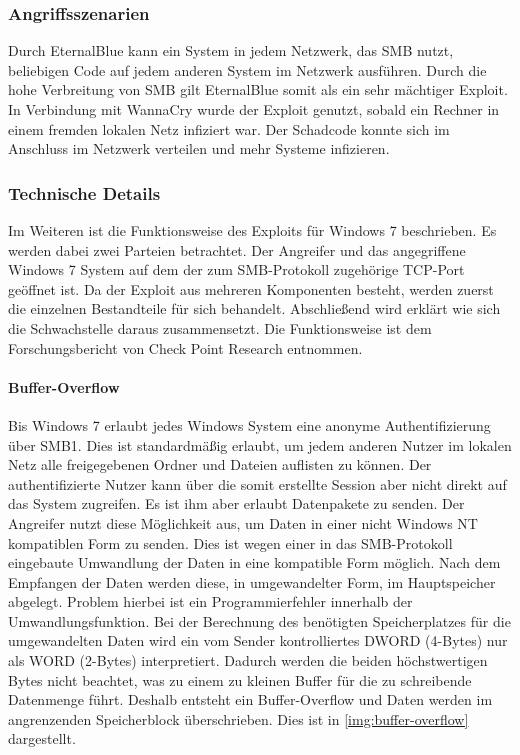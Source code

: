 \documentclass{AIFB_ITI_Crypto_Seminar}
\begin{document}
\subsubsection{Angriffsszenarien}
Durch EternalBlue kann ein System in jedem Netzwerk, das SMB nutzt, beliebigen Code auf jedem anderen System im Netzwerk ausführen. Durch die hohe Verbreitung von SMB gilt EternalBlue somit als ein sehr mächtiger Exploit. In Verbindung mit WannaCry wurde der Exploit genutzt, sobald ein Rechner in einem fremden lokalen Netz infiziert war. Der Schadcode konnte sich im Anschluss im Netzwerk verteilen und mehr Systeme infizieren.

\subsubsection{Technische Details}
Im Weiteren ist die Funktionsweise des Exploits für Windows 7 beschrieben. Es werden dabei zwei Parteien betrachtet. Der Angreifer und das angegriffene Windows 7 System auf dem der zum SMB-Protokoll zugehörige TCP-Port geöffnet ist. Da der Exploit aus mehreren Komponenten besteht, werden zuerst die einzelnen Bestandteile für sich behandelt. Abschließend wird erklärt wie sich die Schwachstelle daraus zusammensetzt. Die Funktionsweise ist dem Forschungsbericht von Check Point Research \cite{checkpoint} entnommen.

\paragraph{Buffer-Overflow}
\label{buffover}
Bis Windows 7 erlaubt jedes Windows System eine anonyme Authentifizierung über SMB1. Dies ist standardmäßig erlaubt, um jedem anderen Nutzer im lokalen Netz alle freigegebenen Ordner und Dateien auflisten zu können. Der authentifizierte Nutzer kann über die somit erstellte Session aber nicht direkt auf das System zugreifen. Es ist ihm aber erlaubt Datenpakete zu senden. Der Angreifer nutzt diese Möglichkeit aus, um Daten in einer nicht Windows NT kompatiblen Form zu senden. Dies ist wegen einer in das SMB-Protokoll eingebaute Umwandlung der Daten in eine kompatible Form möglich. Nach dem Empfangen der Daten werden diese, in umgewandelter Form, im Hauptspeicher abgelegt. Problem hierbei ist ein Programmierfehler innerhalb der Umwandlungsfunktion. Bei der Berechnung des benötigten Speicherplatzes für die umgewandelten Daten wird ein vom Sender kontrolliertes DWORD (4-Bytes) nur als WORD (2-Bytes) interpretiert. Dadurch werden die beiden höchstwertigen Bytes nicht beachtet, was zu einem zu kleinen Buffer für die zu schreibende Datenmenge führt. Deshalb entsteht ein Buffer-Overflow und Daten werden im angrenzenden Speicherblock überschrieben. Dies ist in \autoref{img:buffer-overflow} dargestellt.
\end{document}
